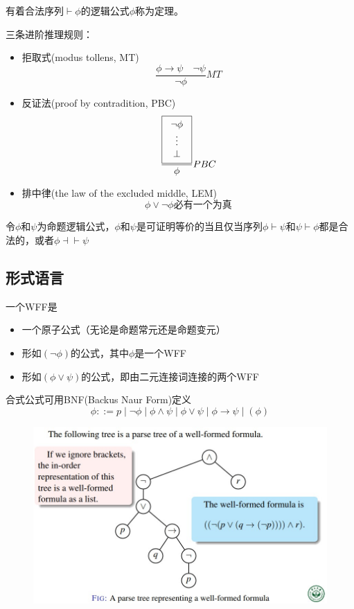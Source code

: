 \begin{definition}[定理(theorem)]
有着合法序列$\vdash\phi$的逻辑公式$\phi$称为定理。
\end{definition}

三条进阶推理规则：
\begin{itemize}
\item 拒取式(modus tollens, MT)
\[\frac{\phi\to\psi\quad \lnot\psi}{\lnot\phi} MT\]
\item 反证法(proof by contradition, PBC)
\[\frac{\fbox{\begin{tabular}{c}$\lnot\phi$\\$\vdots$\\$\bot$\end{tabular}}}{\phi} PBC\]
\item 排中律(the law of the excluded middle, LEM)
\[\phi\lor\lnot\phi\text{必有一个为真}\]
\end{itemize}

\begin{definition}
令$\phi$和$\psi$为命题逻辑公式，$\phi$和$\psi$是可证明等价的当且仅当序列$\phi\vdash\psi$和$\psi\vdash\phi$都是合法的，或者$\phi\dashv\vdash\psi$
\end{definition}

\subsection{形式语言}
\begin{definition}
一个WFF是
\begin{itemize}
	\item 一个原子公式（无论是命题常元还是命题变元）
	\item 形如$(\lnot\phi)$的公式，其中$\phi$是一个WFF
	\item 形如$(\phi\lor\psi)$的公式，即由二元连接词连接的两个WFF
\end{itemize}
\end{definition}
合式公式可用BNF(Backus Naur Form)定义
\[\phi::=p\mid
\lnot\phi\mid
\phi\land\psi\mid
\phi\lor\psi\mid
\phi\to\psi\mid
(\phi)\]
\begin{figure}[H]
\centering
\includegraphics[width=0.8\linewidth]{fig/well-formed_formula.jpg}
\end{figure}

